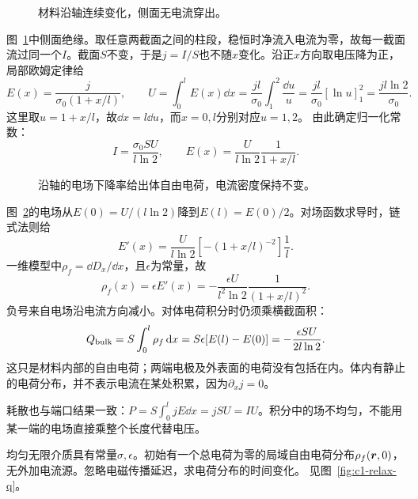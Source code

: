 \begin{figure}[H]\centering
{}
\caption{材料沿轴连续变化，侧面无电流穿出。}\label{fig:c1-charge-volume-q}
\end{figure}
\begin{solution}
图~\ref{fig:c1-charge-volume-q}中侧面绝缘。取任意两截面之间的柱段，稳恒时净流入电流为零，故每一截面流过同一个$I$。截面$S$不变，于是$j=I/S$也不随$x$变化。沿正$x$方向取电压降为正，局部欧姆定律给
\[
 E(x)=\frac{j}{\sigma_0(1+x/l)},\qquad
 U=\int_0^lE(x)\dd x
 =\frac{jl}{\sigma_0}\int_1^2\frac{\dd u}{u}
 =\frac{jl}{\sigma_0}[\ln u]_1^2
 =\frac{jl\ln2}{\sigma_0}.
\]
这里取$u=1+x/l$，故$\dd x=l\dd u$，而$x=0,l$分别对应$u=1,2$。
由此确定归一化常数：
\[
 \boxed{I=\frac{\sigma_0SU}{l\ln2}},\qquad
 E(x)=\frac{U}{l\ln2}\frac1{1+x/l}.
\]
\begin{figure}[H]\centering
{}
\caption{沿轴的电场下降率给出体自由电荷，电流密度保持不变。}\label{fig:c1-charge-volume-s}
\end{figure}
图~\ref{fig:c1-charge-volume-s}的电场从$E(0)=U/(l\ln2)$降到$E(l)=E(0)/2$。对场函数求导时，链式法则给
\[
 E'(x)=\frac{U}{l\ln2}[-(1+x/l)^{-2}]\frac1l.
\]
一维模型中$\rho_f=\dd D_x/\dd x$，且$\epsilon$为常量，故
\[
 \boxed{\rho_f(x)=\epsilon E'(x)
 =-\frac{\epsilon U}{l^2\ln2}\frac1{(1+x/l)^2}}.
\]
负号来自电场沿电流方向减小。对体电荷积分时仍须乘横截面积：
\[
 Q_{\rm bulk}=S\int_0^l\rho_f\mathop{}\!\mathrm d x
 =S\epsilon[E(l)-E(0)]
 =-\frac{\epsilon SU}{2l\ln2}.
\]
这只是材料内部的自由电荷；两端电极及外表面的电荷没有包括在内。体内有静止的电荷分布，并不表示电流在某处积累，因为$\partial_xj=0$。

耗散也与端口结果一致：$P=S\int_0^ljE\dd x=jSU=IU$。积分中的场不均匀，不能用某一端的电场直接乘整个长度代替电压。
\end{solution}

\begin{example}[均匀介质中的电荷弛豫]\label{ex:c1-relax}
均匀无限介质具有常量$\sigma,\epsilon$。初始有一个总电荷为零的局域自由电荷分布$\rho_f(\bm{r},0)$，无外加电流源。忽略电磁传播延迟，求电荷分布的时间变化。 见图~\ref{fig:c1-relax-q}。
\end{example}

